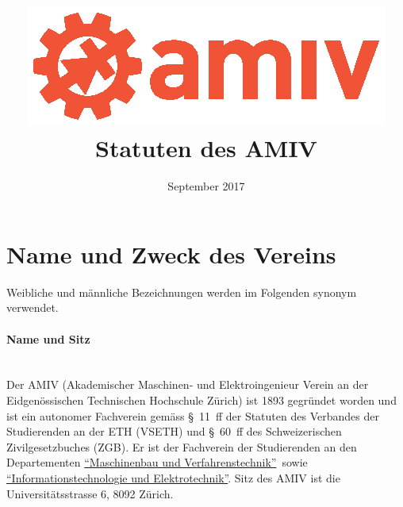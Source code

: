 \documentclass[a4paper,11pt]{article}
\title{\includegraphics[scale=1.5]{amiv-logo.eps} \\\vspace{1.8cm} Statuten des AMIV}
\date{September 2017}
\begin{document}
\maketitle




\newcommand{\ITET}{\href{http://www.ee.ethz.ch/}{``Informationstechnologie und Elektrotechnik''}}
\newcommand{\MAVT}{\href{http://www.mavt.ethz.ch/}{``Maschinenbau und Verfahrenstechnik''}}





\section{Name und Zweck des Vereins}

Weibliche und männliche Bezeichnungen werden im Folgenden synonym verwendet.

\paragraph{Name und Sitz} \ \\
Der AMIV (Akademischer Maschinen- und Elektroingenieur Verein an der Eidgenössischen Technischen Hochschule Zürich) ist 1893 gegründet worden und ist ein autonomer Fachverein gemäss \mbox{§ 11 ff} der Statuten des Verbandes der Studierenden an der ETH (VSETH) und \mbox{§ 60 ff} des Schweizerischen Zivilgesetzbuches (ZGB). Er ist der Fachverein der Studierenden an den Departementen \MAVT\ sowie \ITET. Sitz des AMIV ist die Universitätsstrasse 6, 8092 Zürich.
\end{document}
